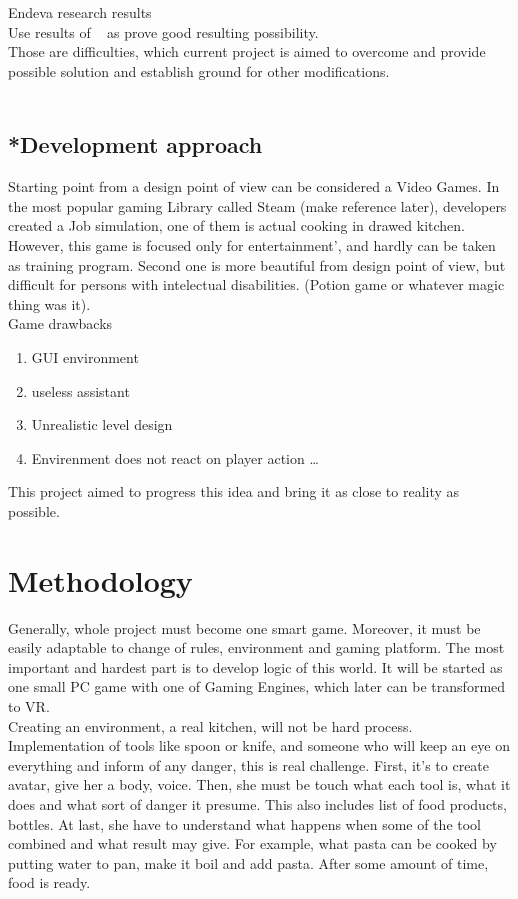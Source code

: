 \documentclass[18pt]{article}
\numberwithin{equation}{section} %
\numberwithin{figure}{section} %
\numberwithin{table}{section} %
\begin{document}
	Endeva research results \\
	
	Use results of ~\cite{LOTAN2009229} as prove good resulting possibility. \\
	
	Those are difficulties, which current project is aimed to overcome and provide possible solution and establish ground for other modifications. \\ \\
	
	\subsection{*Development approach}
	Starting point from a design point of view can be considered a Video Games. In the most popular gaming Library called Steam (make reference later), developers created a Job simulation, one of them is actual cooking in drawed kitchen. However, this game is focused only for entertainment', and hardly can be taken as training program. Second one is more beautiful from design point of view, but difficult for persons with intelectual disabilities. (Potion game or whatever magic thing was it). \\
	
	Game drawbacks
	\begin{enumerate}
		\item GUI environment
		\item useless assistant
		\item Unrealistic level design
		\item Envirenment does not react on player action
		\ldots
	\end{enumerate}

	This project aimed to progress this idea and bring it as close to reality as possible. \\
	
\section{Methodology}	
	Generally, whole project must become one smart game. Moreover, it must be easily adaptable to change of rules, environment and gaming platform. The most important and hardest part is to develop logic of this world. It will be started as one small PC game with one of Gaming Engines, which later can be transformed to VR. \\
	
	Creating an environment, a real kitchen, will not be hard process. Implementation of tools like spoon or knife, and someone who will keep an eye on everything and inform of any danger, this is real challenge. First, it's to create avatar, give her a body, voice. Then, she must be touch what each tool is, what it does and what sort of danger it presume. This also includes list of food products, bottles. At last, she have to understand what happens when some of the tool combined and what result may give. For example, what pasta can be cooked by putting water to pan, make it boil and add pasta. After some amount of time, food is ready. \\
	
\end{document}
